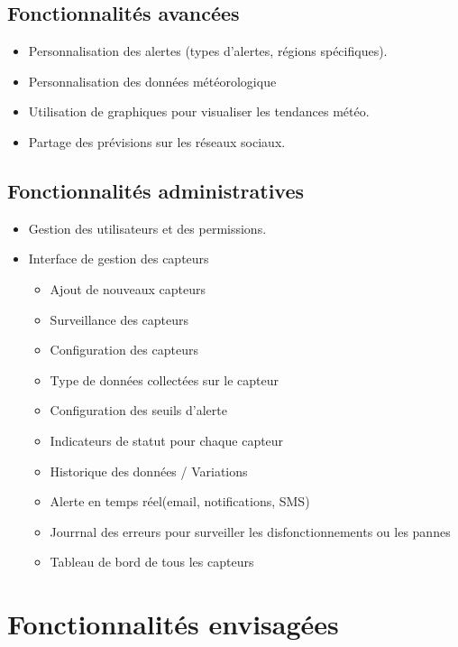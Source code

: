 \documentclass[a4paper,12pt]{article}
\begin{document}
\subsection{Fonctionnalités avancées}
\begin{itemize}
    \item Personnalisation des alertes (types d’alertes, régions spécifiques).
    \item Personnalisation des données météorologique
    \item Utilisation de graphiques pour visualiser les tendances météo.
    \item Partage des prévisions sur les réseaux sociaux.
 

\end{itemize}

\subsection{Fonctionnalités administratives}
\begin{itemize}
    \item Gestion des utilisateurs et des permissions.
    
    \item Interface de gestion des capteurs
    \begin{itemize}
        \item Ajout de nouveaux capteurs
        \item Surveillance des capteurs
        \item Configuration des capteurs
        \item Type de données collectées sur le capteur
	\item Configuration des seuils d'alerte
        \item Indicateurs de statut pour chaque capteur
     \item Historique des données / Variations
    \item Alerte en temps réel(email, notifications, SMS)
	\item Jourrnal des erreurs pour surveiller les disfonctionnements ou les pannes
\item Tableau de bord de tous les capteurs 
    
\end{itemize}
\end{itemize}

\section{Fonctionnalités envisagées}
\end{document}
